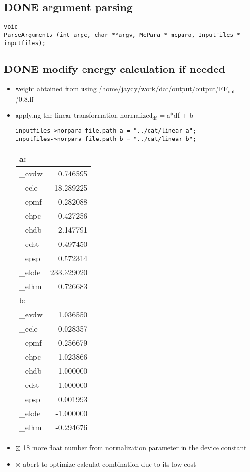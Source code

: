 \documentclass[11pt]{article}
\begin{document}
\subsection{{\bfseries\sffamily DONE} argument parsing}
\label{sec-3-5}
\begin{verbatim}
void
ParseArguments (int argc, char **argv, McPara * mcpara, InputFiles * inputfiles);
\end{verbatim}
\subsection{{\bfseries\sffamily DONE} modify energy calculation if needed}
\label{sec-3-6}
\begin{itemize}
\item weight abtained from using /home/jaydy/work/dat/output/output/FF$_{\text{opt}}$/0.8.ff
\item applying the linear transformation normalized$_{\text{df}}$ = a*df + b
\begin{verbatim}
inputfiles->norpara_file.path_a = "../dat/linear_a";
inputfiles->norpara_file.path_b = "../dat/linear_b";
\end{verbatim}
\begin{center}
\begin{tabular}{lr}
a: & \\
\hline
\_evdw & 0.746595\\
\_eele & 18.289225\\
\_epmf & 0.282088\\
\_ehpc & 0.427256\\
\_ehdb & 2.147791\\
\_edst & 0.497450\\
\_epsp & 0.572314\\
\_ekde & 233.329020\\
\_elhm & 0.726683\\
\hline
b: & \\
\hline
\_evdw & 1.036550\\
\_eele & -0.028357\\
\_epmf & 0.256679\\
\_ehpc & -1.023866\\
\_ehdb & 1.000000\\
\_edst & -1.000000\\
\_epsp & 0.001993\\
\_ekde & -1.000000\\
\_elhm & -0.294676\\
\end{tabular}
\end{center}
\item $\boxtimes$ 18 more float number from normalization parameter in the device constant

\item $\boxtimes$ abort to optimize calculat combination due to its low cost
\end{itemize}
\end{document}
